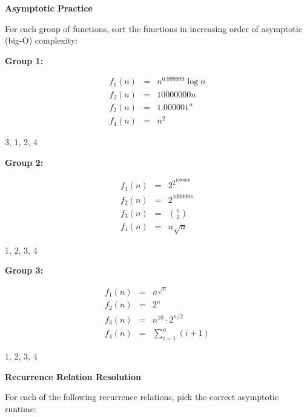 \documentclass[12pt,twoside]{article}
\begin{document}
\begin{problems}

\problem {} \textbf{Asymptotic Practice}

For each group of functions, sort the functions in increasing order of
asymptotic (big-O) complexity:

\begin{problemparts}

\problempart {} \textbf{Group 1:}

$$
\begin{array}{rcl}
f_1(n) &=& n^{0.999999} \log n \\
f_2(n) &=& 10000000 n \\
f_3(n) &=& 1.000001^n \\
f_4(n) &=& n^2
\end{array}
$$

\ifsolution \solution{}
3, 1, 2, 4
\fi

\problempart {} \textbf{Group 2:}

$$
\begin{array}{rcl}
f_1(n) &=& 2^{2^{1000000}} \\
f_2(n) &=& 2^{100000n} \\
f_3(n) &=& \displaystyle \binom{n}{2} \\
f_4(n) &=& n \sqrt{n}
\end{array}
$$

\ifsolution \solution{}
1, 2, 3, 4
\fi

\problempart {} \textbf{Group 3:}

$$
\begin{array}{rcl}
f_1(n) &=& n^{\sqrt{n}} \\
f_2(n) &=& 2^n \\
f_3(n) &=& n^{10} \cdot 2^{n / 2} \\
f_4(n) &=& \displaystyle\sum_{i = 1}^{n} (i + 1)
\end{array}
$$

\ifsolution \solution{}
1, 2, 3, 4
\fi

\end{problemparts}

\problem {} \textbf{Recurrence Relation Resolution}

For each of the following recurrence relations,
pick the correct asymptotic runtime:


\end{problems}
\end{document}
